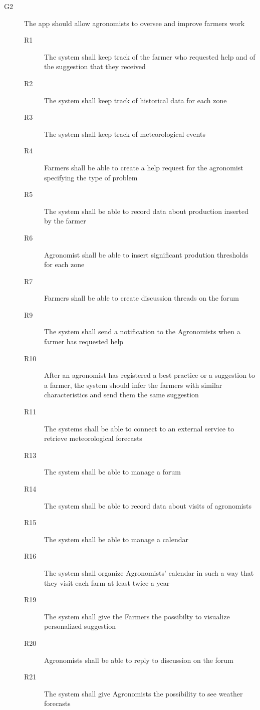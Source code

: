 \begin{description}
\begin{description}
 
        \end{description}
    \item [G2] The app should allow agronomists to oversee and improve farmers work
        \begin{description}
            \item[R1] The system shall keep track of the farmer who requested help and of the suggestion that they received
            \item[R2] The system shall keep track of historical data for each zone
            \item[R3] The system shall keep track of meteorological events
            \item[R4] Farmers shall be able to create a help request for the agronomist specifying the type of problem 
            \item[R5] The system shall be able to record data about production inserted by the farmer
            \item[R6] Agronomist shall be able to insert significant prodution thresholds for each zone
            \item[R7] Farmers shall be able to create discussion threads on the forum 
            \item[R9] The system shall send a notification to the Agronomists when a farmer has requested help
            \item[R10] After an agronomist has registered a best practice or a suggestion to a farmer, the system should infer the farmers with similar characteristics and send them the same suggestion
            \item[R11] The systems shall be able to connect to an external service to retrieve meteorological forecasts
            \item[R13] The system shall be able to manage a forum
            \item[R14] The system shall be able to record data about visits of agronomists
            \item[R15] The system shall be able to manage a calendar
            \item[R16] The system shall organize Agronomists' calendar in such a way that they visit each farm at least twice a year
            \item[R19] The system shall give the Farmers the possibilty to visualize personalized suggestion
            \item[R20] Agronomists shall be able to reply to discussion on the forum
            \item[R21] The system shall give Agronomists the possibility to see weather forecasts

\end{description}
\end{description}
